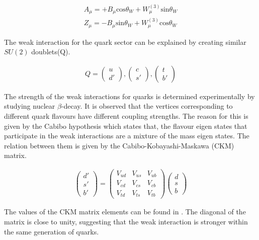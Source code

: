 \begin{align}
A_\mu = +B_\mu \text{cos} \theta_W + W_\mu^{(3)}\text{sin} \theta_W \\
Z_\mu = -B_\mu \text{sin} \theta_W + W_\mu^{(3)}\text{cos} \theta_W 
\end{align}

The weak interaction for the quark sector can be explained by creating similar
$SU(2)$ doublets(Q).

\begin{align}
    Q = \begin{pmatrix} u \\ d' \end{pmatrix}, \begin{pmatrix} c \\ s' \end{pmatrix}, \begin{pmatrix} t \\ b' \end{pmatrix}
\end{align}

The strength of the weak interactions for quarks is determined experimentally by studying
nuclear $\beta$-decay. It is observed that the vertices corresponding to different quark
flavours have different coupling strengths. The reason for this is given by the Cabibo
hypothesis which states that, the flavour eigen states that participate in the weak interactions
are a mixture of the mass eigen states. The relation between them is given by the 
Cabibo-Kobayashi-Maskawa (CKM) matrix. 

\begin{align}
    \begin{pmatrix} d' \\ s' \\ b'\end{pmatrix}
     = \begin{pmatrix} V_{ud} & V_{us} & V_{ub} \\
                       V_{cd} & V_{cs} & V_{cb} \\
                       V_{td} & V_{ts} & V_{tb}
    \end{pmatrix} \begin{pmatrix} d \\ s \\ b\end{pmatrix}
\end{align}

The values of the CKM matrix elements can be found in \cite{pdg2024}. The diagonal
of the matrix is close to unity, suggesting that the weak interaction is stronger within
the same generation of quarks. 

